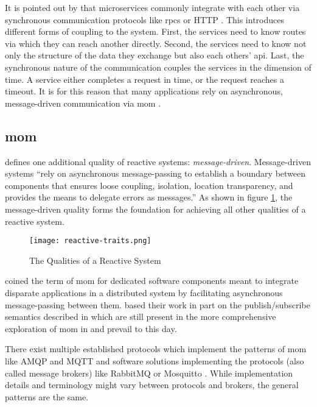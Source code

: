 It is pointed out by \citeauthor{fowler_microservices_2014} that microservices commonly integrate with each other via synchronous communication protocols like \glspl{rpc} or HTTP \parencite{fowler_microservices_2014}.
This introduces different forms of coupling to the system.
First, the services need to know routes via which they can reach another directly.
Second, the services need to know not only the structure of the data they exchange but also each others' \gls{api}.
Last, the synchronous nature of the communication couples the services in the dimension of time.
A service either completes a request in time, or the request reaches a timeout.
It is for this reason that many applications rely on asynchronous, message-driven communication via \gls{mom} \parencite{fowler_microservices_2014}.

\subsection{\acrlong{mom}}

\cite{boner_reactive_2014} defines one additional quality of reactive systems: \emph{message-driven}.
Message-driven systems \enquote{rely on asynchronous message-passing to
establish a boundary between components that ensures loose coupling, isolation,
location transparency, and provides the means to delegate errors as messages.} \parencite{boner_reactive_2014}
As shown in figure \ref{fig:reactive-traits}, the message-driven quality forms the foundation for achieving all other qualities of a reactive system.

\begin{figure}
  \centering
  \texttt{[image: reactive-traits.png]}
  \caption{The Qualities of a Reactive System \parencite{boner_reactive_2014}}
  \label{fig:reactive-traits}
\end{figure}

\cite{banavar_case_1999} coined the term of \acrlong{mom} for dedicated software components meant to integrate disparate applications in a distributed system by facilitating asynchronous message-passing between them.
\citeauthor{banavar_case_1999} based their work in part on the publish/subscribe semantics described in \cite{oki_information_1993} which are still present in the more comprehensive exploration of \gls{mom} in \cite{curry_message-oriented_2004} and prevail to this day.

There exist multiple established protocols which implement the patterns of \gls{mom} like AMQP and MQTT \parencites{amqp}{mqtt} and software solutions implementing the protocols (also called message brokers) like RabbitMQ or Mosquitto \parencites{rabbitmq}{mosquitto}.
While implementation details and terminology might vary between protocols and brokers, the general patterns are the same.

